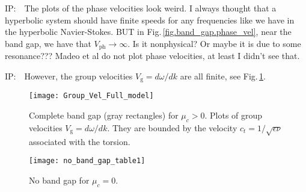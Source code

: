 \documentclass[
10pt, %
a4paper, %
oneside, %
headinclude,footinclude, %
BCOR5mm, %
table,
]{scrartcl}
\newcommand{\IP}[1]{{\color{Red}IP:\ \ #1}}
\begin{document}
\IP{The plots of the phase velocities look weird. I always thought that a hyperbolic system should 
have finite speeds for any frequencies like we have in the hyperbolic Navier-Stokes. BUT in 
Fig.\,\ref{fig.band_gap.phase_vel}, near 
the band gap, we have that $ V_{\text{ph}} \rightarrow \infty $. Is it nonphysical? Or maybe it is 
due to some resonance??? Madeo et al do not plot phase velocities, at least I didn't see that.
}

\IP{However, the group velocities $ V_{\text{g}} =d\omega/d k$ are all finite, see 
Fig.\,\ref{fig.band_gap.group_vel}.}



\begin{figure}
	\begin{center}
		\texttt{[image: Group\_Vel\_Full\_model]}
	\end{center}
	\vspace{-4mm}
	\caption{Complete band gap (gray rectangles) for $ \mu_c >0 $. Plots of group velocities $ 
	V_{\text{g}} = d \omega/d k $. They are bounded by the velocity $ c_t = 1/\sqrt{\epsilon\nu} $ 
	associated with the torsion.}
	\label{fig.band_gap.group_vel}
\end{figure}


\begin{figure}
	\begin{center}
		\texttt{[image: no\_band\_gap\_table1]}
	\end{center}
	\vspace{-4mm}
	\caption{No band gap for $ \mu_c = 0$.}
	\label{fig.no_band_gap}
\end{figure}

\printbibliography
\end{document}
